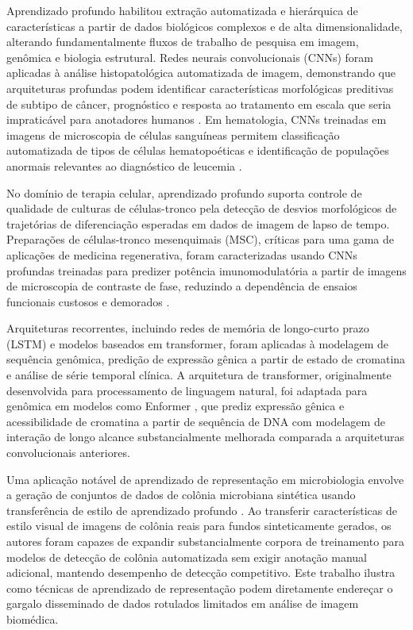 Aprendizado profundo habilitou extração automatizada e hierárquica de características a partir de dados biológicos complexos e de alta dimensionalidade, alterando fundamentalmente fluxos de trabalho de pesquisa em imagem, genômica e biologia estrutural. Redes neurais convolucionais (CNNs) foram aplicadas à análise histopatológica automatizada de imagem, demonstrando que arquiteturas profundas podem identificar características morfológicas preditivas de subtipo de câncer, prognóstico e resposta ao tratamento em escala que seria impraticável para anotadores humanos \parencite{esteva2017, kather2019}. Em hematologia, CNNs treinadas em imagens de microscopia de células sanguíneas permitem classificação automatizada de tipos de células hematopoéticas e identificação de populações anormais relevantes ao diagnóstico de leucemia \parencite{matek2019}.

No domínio de terapia celular, aprendizado profundo suporta controle de qualidade de culturas de células-tronco pela detecção de desvios morfológicos de trajetórias de diferenciação esperadas em dados de imagem de lapso de tempo. Preparações de células-tronco mesenquimais (MSC), críticas para uma gama de aplicações de medicina regenerativa, foram caracterizadas usando CNNs profundas treinadas para predizer potência imunomodulatória a partir de imagens de microscopia de contraste de fase, reduzindo a dependência de ensaios funcionais custosos e demorados \parencite{kusumoto2021}.

Arquiteturas recorrentes, incluindo redes de memória de longo-curto prazo (LSTM) e modelos baseados em transformer, foram aplicadas à modelagem de sequência genômica, predição de expressão gênica a partir de estado de cromatina e análise de série temporal clínica. A arquitetura de transformer, originalmente desenvolvida para processamento de linguagem natural, foi adaptada para genômica em modelos como Enformer \parencite{avsec2021}, que prediz expressão gênica e acessibilidade de cromatina a partir de sequência de DNA com modelagem de interação de longo alcance substancialmente melhorada comparada a arquiteturas convolucionais anteriores.

Uma aplicação notável de aprendizado de representação em microbiologia envolve a geração de conjuntos de dados de colônia microbiana sintética usando transferência de estilo de aprendizado profundo \parencite{pawlowski2022}. Ao transferir características de estilo visual de imagens de colônia reais para fundos sinteticamente gerados, os autores foram capazes de expandir substancialmente corpora de treinamento para modelos de detecção de colônia automatizada sem exigir anotação manual adicional, mantendo desempenho de detecção competitivo. Este trabalho ilustra como técnicas de aprendizado de representação podem diretamente endereçar o gargalo disseminado de dados rotulados limitados em análise de imagem biomédica.

